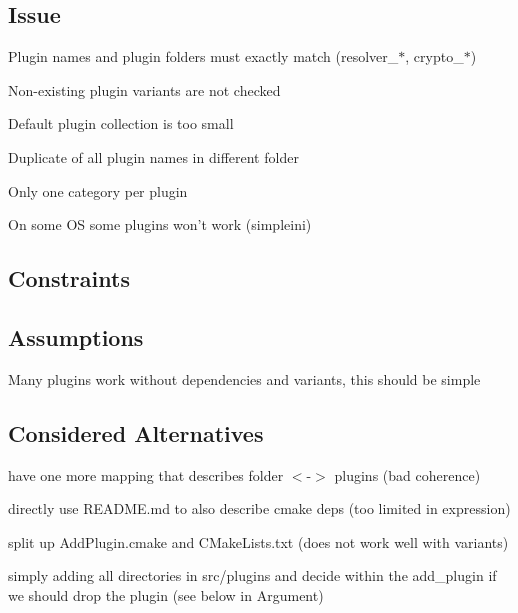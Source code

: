 \subsection*{Issue}


\begin{DoxyItemize}
\item Plugin names and plugin folders must exactly match (resolver\+\_\+$\ast$, crypto\+\_\+$\ast$)
\item Non-\/existing plugin variants are not checked
\item Default plugin collection is too small
\item Duplicate of all plugin names in different folder
\item Only one category per plugin
\item On some O\+S some plugins won't work (simpleini)
\end{DoxyItemize}

\subsection*{Constraints}

\subsection*{Assumptions}


\begin{DoxyItemize}
\item Many plugins work without dependencies and variants, this should be simple
\end{DoxyItemize}

\subsection*{Considered Alternatives}


\begin{DoxyItemize}
\item have one more mapping that describes folder $<$-\/$>$ plugins (bad coherence)
\item directly use R\+E\+A\+D\+M\+E.\+md to also describe cmake deps (too limited in expression)
\item split up Add\+Plugin.\+cmake and C\+Make\+Lists.\+txt (does not work well with variants)
\item simply adding all directories in src/plugins and decide within the {\ttfamily add\+\_\+plugin} if we should drop the plugin (see below in Argument)
\end{DoxyItemize}

